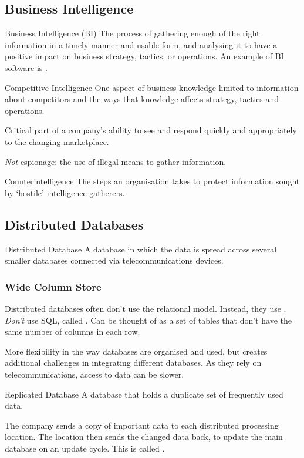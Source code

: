 \documentclass[\main/notes.tex]{subfiles}
\begin{document}
			\subsection{Business Intelligence}
				\begin{definition}{Business Intelligence (BI)}
					The process of gathering enough of the right information in a timely manner and usable form, and analysing it to have a positive impact on business strategy, tactics, or operations. An example of BI software is .
				\end{definition}
				\begin{definition}{Competitive Intelligence}
					One aspect of business knowledge limited to information about competitors and the ways that knowledge affects strategy, tactics and operations.

					Critical part of a company's ability to see and respond quickly and appropriately to the changing marketplace.

					\emph{Not} espionage: the use of illegal means to gather information.
				\end{definition}
				\begin{definition}{Counterintelligence}
					The steps an organisation takes to protect information sought by `hostile' intelligence gatherers.
				\end{definition}
			\pagebreak
			\subsection{Distributed Databases}
				\begin{definition}{Distributed Database}
					A database in which the data is spread across several smaller databases connected via telecommunications devices.
				\end{definition}
				\subsubsection{Wide Column Store}
					Distributed databases often don't use the relational model. Instead, they use . \emph{Don't} use SQL, called . Can be thought of as a set of tables that don't have the same number of columns in each row.

					More flexibility in the way databases are organised and used, but creates additional challenges in integrating different databases. As they rely on telecommunications, access to data can be slower.
					\begin{definition}{Replicated Database}
						A database that holds a duplicate set of frequently used data.

						The company sends a copy of important data to each distributed processing location. The location then sends the changed data back, to update the main database on an update cycle. This is called .
					\end{definition}
\end{document}
